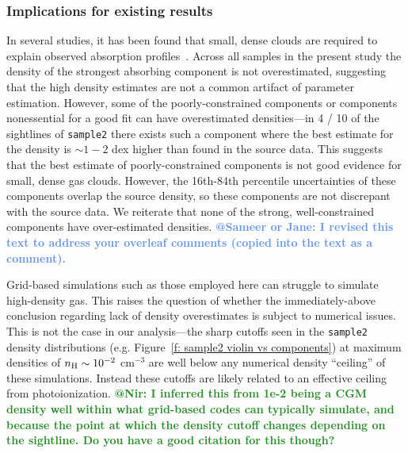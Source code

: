 \documentclass[fleqn,usenatbib]{mnras}
\makeatletter
\newcommand{\atsameer}[1]{\textcolor{CornflowerBlue}{\textbf{@Sameer or Jane: #1}}}
\newcommand{\atnir}[1]{\textcolor{ForestGreen}{\textbf{@Nir: #1}}}
\makeatother
\begin{document}
\subsubsection{Implications for existing results}
\label{s: discussion -- cloud structure -- implications}

In several studies, it has been found that small, dense clouds are required to explain observed absorption profiles~\citep{Rigby2002, Narayanan2008, Muzahid2018}.
Across all samples in the present study the density of the strongest absorbing component is not overestimated,
suggesting that the high density estimates are not a common artifact of parameter estimation.
However, some of the poorly-constrained components or components nonessential for a good fit can have overestimated densities---in 4 / 10 of the sightlines of \texttt{sample2} there exists such a component where the best estimate for the density is $\sim 1-2$ dex higher than found in the source data.
This suggests that the best estimate of poorly-constrained components is not good evidence for small, dense gas clouds.
However, the 16th-84th percentile uncertainties of these components overlap the source density,
so these components are not discrepant with the source data.
We reiterate that none of the strong, well-constrained components have over-estimated densities.
\atsameer{I revised this text to address your overleaf comments (copied into the text as a comment).}

Grid-based simulations such as those employed here can struggle to simulate high-density gas.
This raises the question of whether the immediately-above conclusion regarding lack of density overestimates is subject to numerical issues.
This is not the case in our analysis---the sharp cutoffs seen in the \texttt{sample2} density distributions (e.g. Figure~\ref{f: sample2 violin vs components})  at maximum densities of $n_{\rm H} \sim 10^{-2}$ cm$^{-3}$ are well below any numerical density ``ceiling'' of these simulations.
Instead these cutoffs are likely related to an effective ceiling from photoionization.
\atnir{I inferred this from 1e-2 being a CGM density well within what grid-based codes can typically simulate, and because the point at which the density cutoff changes depending on the sightline. Do you have a good citation for this though?}
\end{document}
